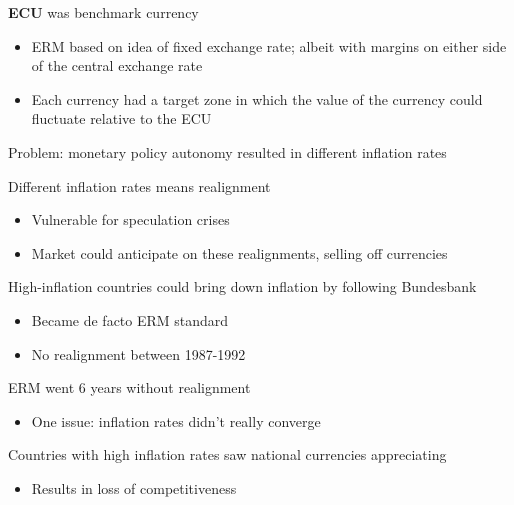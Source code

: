 \documentclass{beamer}
\begin{document}
\begin{frame}
  \textbf{ECU} was benchmark currency
  \begin{itemize}
    \item ERM based on idea of fixed exchange rate; albeit with margins on either side of the central exchange rate
    \item Each currency had a target zone in which the value of the currency could fluctuate relative to the ECU
  \end{itemize}
  \medskip
  Problem: monetary policy autonomy resulted in different inflation rates
\end{frame}

\begin{frame}
  Different inflation rates means realignment
  \begin{itemize}
    \item Vulnerable for speculation crises
    \item Market could anticipate on these realignments, selling off currencies
  \end{itemize}
  \medskip
  High-inflation countries could bring down inflation by following Bundesbank  
  \begin{itemize}
    \item Became de facto ERM standard
    \item No realignment between 1987-1992
  \end{itemize} 
\end{frame}

\begin{frame}
 ERM went 6 years without realignment
 \begin{itemize} 
  \item One issue: inflation rates didn't really converge
 \end{itemize}
 \medskip
 Countries with high inflation rates saw national currencies appreciating
 \begin{itemize}
   \item Results in loss of competitiveness
 \end{itemize}
\end{frame}
\end{document}
